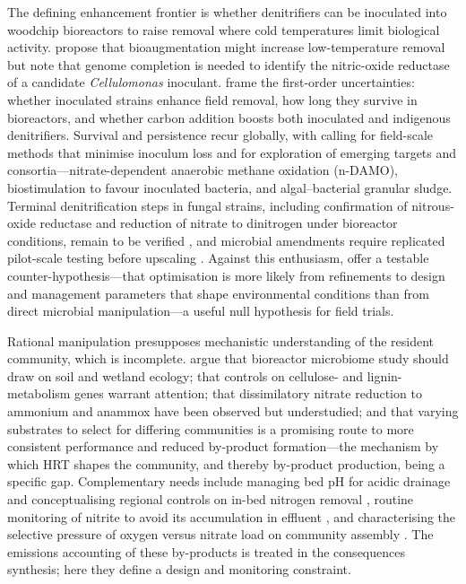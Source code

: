 The defining enhancement frontier is whether denitrifiers can be inoculated into
woodchip bioreactors to raise removal where cold temperatures limit biological
activity. \textcite{Jang2019} propose that bioaugmentation might increase
low-temperature removal but note that genome completion is needed to identify the
nitric-oxide reductase of a candidate \emph{Cellulomonas} inoculant.
\textcite{Anderson2020} frame the first-order uncertainties: whether inoculated
strains enhance field removal, how long they survive in bioreactors, and whether
carbon addition boosts both inoculated and indigenous denitrifiers. Survival and
persistence recur globally, with \textcite{Wang2025b} calling for field-scale
methods that minimise inoculum loss and for exploration of emerging targets and
consortia---nitrate-dependent anaerobic methane oxidation (n-DAMO), biostimulation
to favour inoculated bacteria, and algal--bacterial granular sludge. Terminal
denitrification steps in fungal strains, including confirmation of nitrous-oxide
reductase and reduction of nitrate to dinitrogen under bioreactor conditions,
remain to be verified \parencite{Aldossari2021}, and microbial amendments require
replicated pilot-scale testing before upscaling
\parencite{Jeglot2022,Ma2021}. Against this enthusiasm,
\textcite{Hathaway2015} offer a testable counter-hypothesis---that optimisation is
more likely from refinements to design and management parameters that shape
environmental conditions than from direct microbial manipulation---a useful null
hypothesis for field trials.

Rational manipulation presupposes mechanistic understanding of the resident
community, which is incomplete. \textcite{Hartfiel2022} argue that bioreactor
microbiome study should draw on soil and wetland ecology; that controls on
cellulose- and lignin-metabolism genes warrant attention; that dissimilatory
nitrate reduction to ammonium and anammox have been observed but understudied;
and that varying substrates to select for differing communities is a promising
route to more consistent performance and reduced by-product formation---the
mechanism by which HRT shapes the community, and thereby by-product production,
being a specific gap. Complementary needs include managing bed pH for acidic
drainage and conceptualising regional controls on in-bed nitrogen removal
\parencite{Bock2018}, routine monitoring of nitrite to avoid its accumulation in
effluent \parencite{Kouanda2021}, and characterising the selective pressure of
oxygen versus nitrate load on community assembly \parencite{Schaefer2021}. The
emissions accounting of these by-products is treated in the consequences
synthesis; here they define a design and monitoring constraint.

